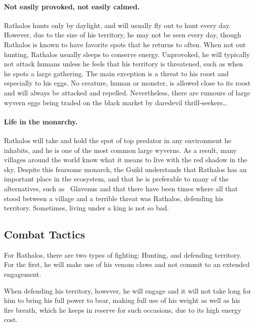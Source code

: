 \paragraph*{Not easily provoked, not easily calmed.} Rathalos hunts only by daylight, and will usually fly out to hunt every day. However, due to the size of his territory, he may not be seen every day, though Rathalos is known to have favorite spots that he returns to often. When not out hunting, Rathalos usually sleeps to conserve energy. Unprovoked, he will typically not attack humans unless he feels that his territory is threatened, such as when he spots a large gathering. The main exception is a threat to his roost and especially to his eggs. No creature, human or monster, is allowed close to its roost and will always be attacked and repelled. Nevertheless, there are rumours of large wyvern eggs being traded on the black market by daredevil thrill-seekers\ldots

\paragraph*{Life in the monarchy.} Rathalos will take and hold the spot of top predator in any environment he inhabits, and he is one of the most common large wyverns. As a result, many villages around the world know what it means to live with the red shadow in the sky. Despite this fearsome monarch, the Guild understands that Rathalos has an important place in the ecosystem, and that he is preferable to many of the alternatives, such as ~Glavenus and that there have been times where all that stood between a village and a terrible threat was Rathalos, defending his territory. Sometimes, living under a king is not so bad.

\pagebreak[3]

\subsection{Combat Tactics}
For Rathalos, there are two types of fighting: Hunting, and defending territory. For the first, he will make use of his venom claws and not commit to an extended engagement.

When defending his territory, however, he will engage and it will not take long for him to bring his full power to bear, making full use of his weight as well as his fire breath, which he keeps in reserve for such occasions, due to its high energy cost.

